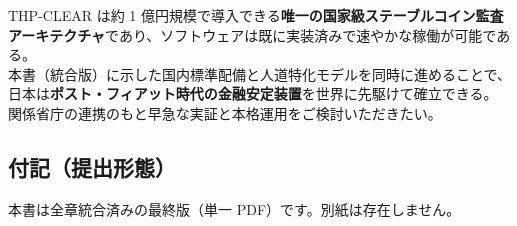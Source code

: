 \documentclass[
]{article}
\begin{document}
THP-CLEAR は約 1
億円規模で導入できる\textbf{唯一の国家級ステーブルコイン監査アーキテクチャ}であり、ソフトウェアは既に実装済みで速やかな稼働が可能である。\\
本書（統合版）に示した国内標準配備と人道特化モデルを同時に進めることで、日本は\textbf{ポスト・フィアット時代の金融安定装置}を世界に先駆けて確立できる。\\
関係省庁の連携のもと早急な実証と本格運用をご検討いただきたい。

\subsection{付記（提出形態）}\label{ux4ed8ux8a18ux63d0ux51faux5f62ux614b}

本書は全章統合済みの最終版（単一 PDF）です。別紙は存在しません。
\end{document}
